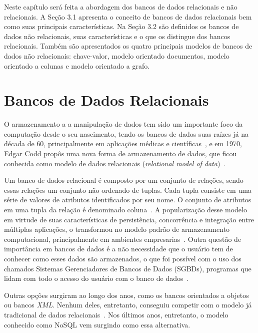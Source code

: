 Neste capítulo será feita a abordagem dos bancos de dados relacionais e não relacionais. A Seção 3.1 apresenta o conceito de bancos de dados relacionais bem como suas principais características. Na Seção 3.2 são definidos os bancos de dados não relacionais, suas características e o que os distingue dos bancos relacionais. Também são apresentados os quatro principais modelos de bancos de dados não relacionais: chave-valor, modelo orientado documentos, modelo orientado a colunas e modelo orientado a grafo.

\section{Bancos de Dados Relacionais}
O armazenamento a a manipulação de dados tem sido um importante foco da computação desde o seu nascimento, tendo os bancos de dados suas raízes já na década de 60, principalmente em aplicações médicas e científicas~\cite{neufeld1986database}, e em 1970, Edgar Codd propôs uma nova forma de armazenamento de dados, que ficou conhecida como modelo de dados relacionais (\emph{relational model of data})~\cite{codd1970relational}. 

Um banco de dados relacional é composto por um conjunto de relações, sendo essas relações um conjunto não ordenado de tuplas. Cada tupla consiste em uma série de valores de atributos identificados por seu nome. O conjunto de atributos em uma tupla da relação é denominado coluna~\cite{heuser}. A popularização desse modelo em virtude de suas características de persistência, concorrência e integração entre múltiplas aplicações, o transformou no modelo padrão de armazenamento computacional, principalmente em ambientes empresarias~\cite{pramod}. Outra questão de importância em bancos de dados é a não necessidade que o usuário tem de conhecer como esses dados são armazenados, o que foi possível com o uso dos chamados Sistemas Gerenciadores de Bancos de Dados (SGBDs), programas que lidam com todo o acesso do usuário com o banco de dados~\cite{jan, cjdate}.

Outras opções surgiram ao longo dos anos, como os bancos orientados a objetos ou bancos \emph{XML}. Nenhum deles, entretanto, conseguiu competir com o modelo já tradicional de dados relacionais~\cite{pramod}. Nos últimos anos, entretanto, o modelo conhecido como NoSQL vem surgindo como essa alternativa.


